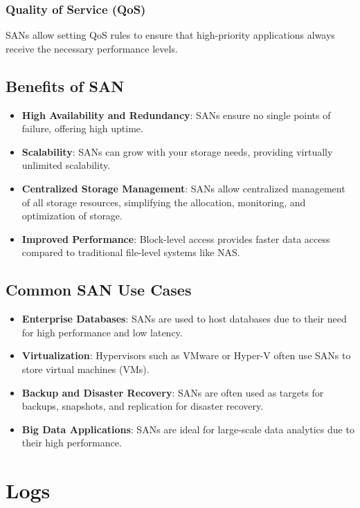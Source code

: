 \documentclass{article}
\begin{document}
\subsubsection{Quality of Service (QoS)}
SANs allow setting QoS rules to ensure that high-priority applications always receive the necessary performance levels.

\subsection{Benefits of SAN}
\begin{itemize}
    \item \textbf{High Availability and Redundancy}: SANs ensure no single points of failure, offering high uptime.
    \item \textbf{Scalability}: SANs can grow with your storage needs, providing virtually unlimited scalability.
    \item \textbf{Centralized Storage Management}: SANs allow centralized management of all storage resources, simplifying the allocation, monitoring, and optimization of storage.
    \item \textbf{Improved Performance}: Block-level access provides faster data access compared to traditional file-level systems like NAS.
\end{itemize}

\subsection{Common SAN Use Cases}
\begin{itemize}
    \item \textbf{Enterprise Databases}: SANs are used to host databases due to their need for high performance and low latency.
    \item \textbf{Virtualization}: Hypervisors such as VMware or Hyper-V often use SANs to store virtual machines (VMs).
    \item \textbf{Backup and Disaster Recovery}: SANs are often used as targets for backups, snapshots, and replication for disaster recovery.
    \item \textbf{Big Data Applications}: SANs are ideal for large-scale data analytics due to their high performance.
\end{itemize}

\newpage
\section{Logs}
\end{document}
